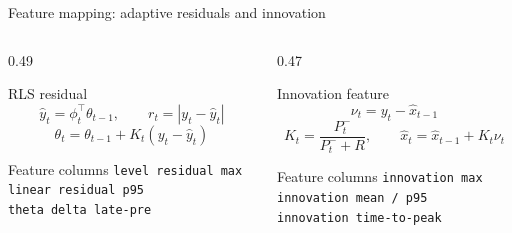 ﻿\documentclass[10pt,aspectratio=169]{beamer}
\newcommand{\code}[1]{\texttt{\footnotesize #1}}
\begin{document}
\begin{frame}{Feature mapping: adaptive residuals and innovation}
\small
\begin{columns}[T,totalwidth=\textwidth]
\begin{column}{0.49\textwidth}
\begin{block}{RLS residual}
\[
\hat{y}_t=\phi_t^\top\theta_{t-1},\qquad
r_t=|y_t-\hat{y}_t|
\]
\[
\theta_t=\theta_{t-1}+K_t(y_t-\hat{y}_t)
\]
\end{block}
\begin{exampleblock}{Feature columns}
\code{level residual max}\\
\code{linear residual p95}\\
\code{theta delta late-pre}
\end{exampleblock}
\end{column}
\begin{column}{0.47\textwidth}
\begin{alertblock}{Innovation feature}
\[
\nu_t=y_t-\hat{x}_{t-1}
\]
\[
K_t=\frac{P_t^-}{P_t^-+R},\qquad
\hat{x}_t=\hat{x}_{t-1}+K_t\nu_t
\]
\end{alertblock}
\begin{exampleblock}{Feature columns}
\code{innovation max}\\
\code{innovation mean / p95}\\
\code{innovation time-to-peak}
\end{exampleblock}
\end{column}
\end{columns}
\vspace{2mm}
\centering
{}
\end{frame}
\end{document}
